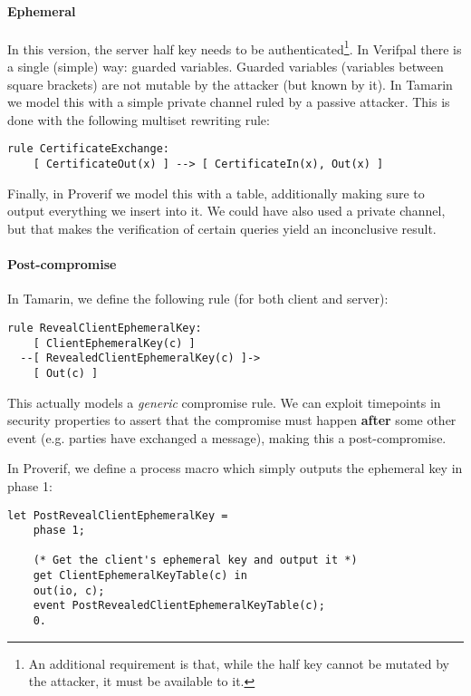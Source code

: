 \paragraph{Ephemeral} In this version, the server half key needs to be authenticated\footnote{An additional requirement is that, while the half key cannot be mutated by the attacker, it must be available to it.}. In Verifpal there is a single (simple) way: guarded variables. Guarded variables (variables between square brackets) are not mutable by the attacker (but known by it). In Tamarin we model this with a simple private channel ruled by a passive attacker. This is done with the following multiset rewriting rule:


\lstset{language=tamarin}
\begin{lstlisting}
rule CertificateExchange:
    [ CertificateOut(x) ] --> [ CertificateIn(x), Out(x) ]
\end{lstlisting}

Finally, in Proverif we model this with a table, additionally making sure to output everything we insert into it. We could have also used a private channel, but that makes the verification of certain queries yield an inconclusive result.

\paragraph{Post-compromise} In Tamarin, we define the following rule (for both client and server):

\lstset{language=tamarin}
\begin{lstlisting}
rule RevealClientEphemeralKey:
    [ ClientEphemeralKey(c) ]
  --[ RevealedClientEphemeralKey(c) ]->
    [ Out(c) ]
\end{lstlisting}

This actually models a \textit{generic} compromise rule. We can exploit timepoints in security properties to assert that the compromise must happen \textbf{after} some other event (e.g. parties have exchanged a message), making this a post-compromise.

In Proverif, we define a process macro which simply outputs the ephemeral key in phase 1:

\lstset{language=proverif}
\begin{lstlisting}
let PostRevealClientEphemeralKey =
    phase 1;

    (* Get the client's ephemeral key and output it *)
    get ClientEphemeralKeyTable(c) in
    out(io, c);
    event PostRevealedClientEphemeralKeyTable(c);
    0.
\end{lstlisting}

